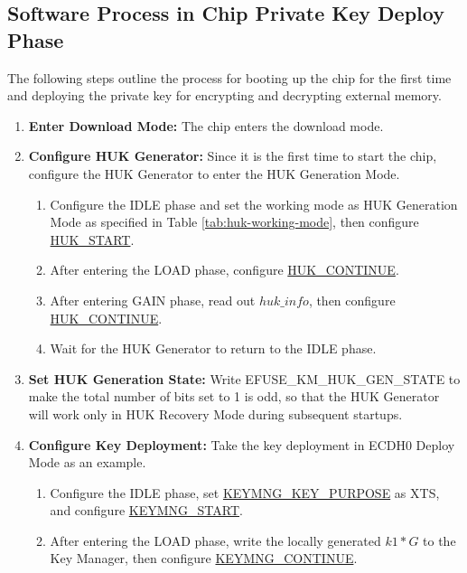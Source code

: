 \documentclass[main\_\_EN.tex]{subfiles}
\begin{document}
\subsection{Software Process in Chip Private Key Deploy Phase}

The following steps outline the process for booting up the chip for the first time and deploying the private key for encrypting and decrypting external memory.

\begin{enumerate}
    \item \textbf{Enter Download Mode:} The chip enters the download mode.
    \item \textbf{Configure HUK Generator:} Since it is the first time to start the chip, configure the HUK Generator to enter the HUK Generation Mode.
    \begin{enumerate}
        \item Configure the IDLE phase and set the working mode as HUK Generation Mode as specified in Table \ref{tab:huk-working-mode}, then configure \hyperref[fielddesc:HUKSTART]{HUK\_START}.
        \item After entering the LOAD phase, configure \hyperref[fielddesc:HUKCONTINUE]{HUK\_CONTINUE}.
        \item After entering GAIN phase, read out \hyperref[para:hukinfo]{\begin{math}huk\_info\end{math}}, then configure \hyperref[fielddesc:HUKCONTINUE]{HUK\_CONTINUE}.
        \item Wait for the HUK Generator to return to the IDLE phase.
    \end{enumerate}
    \item \textbf{Set HUK Generation State:} Write EFUSE\_KM\_HUK\_GEN\_STATE to make the total number of bits set to 1 is odd, so that the HUK Generator will work only in HUK Recovery Mode during subsequent startups.
    \item \textbf{Configure Key Deployment:} Take the key deployment in ECDH0 Deploy Mode as an example.
    \begin{enumerate}
        \item Configure the IDLE phase, set \hyperref[fielddesc:KEYMNGKEYPURPOSE]{KEYMNG\_KEY\_PURPOSE} as XTS, and configure \hyperref[fielddesc:KEYMNGSTART]{KEYMNG\_START}.
        \item After entering the LOAD phase, write the locally generated \begin{math}k1*G\end{math} to the Key Manager, then configure \hyperref[fielddesc:KEYMNGCONTINUE]{KEYMNG\_CONTINUE}.

\end{enumerate}
\end{enumerate}
\end{document}
